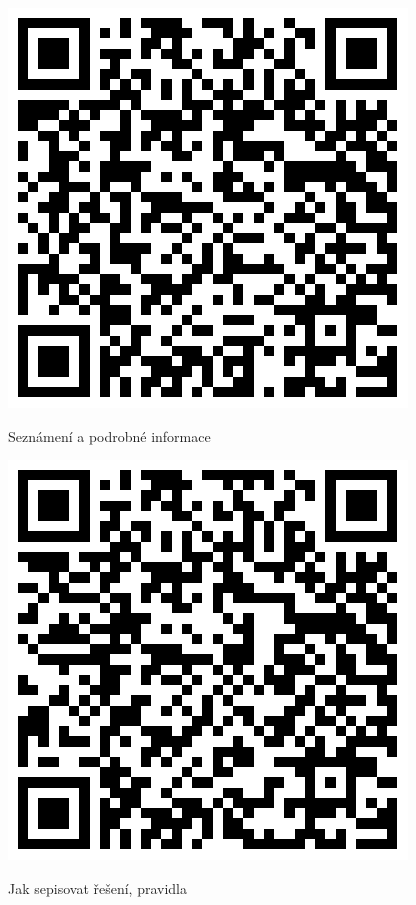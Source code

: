 \documentclass[12pt]{article}
\begin{document}
\begin{figure}[H]
      \includegraphics[scale=0.3]{../../../../propagace/qrcodes/introduction.png}
      \begin{center}
        Seznámení a podrobné informace
        \end{center}
    \endminipage\hfill
      \includegraphics[scale=0.3]{../../../../propagace/qrcodes/instructions.png}
      \begin{center}
        Jak sepisovat řešení, pravidla
        \end{center}
    \endminipage\hfill

\end{figure}
\end{document}
